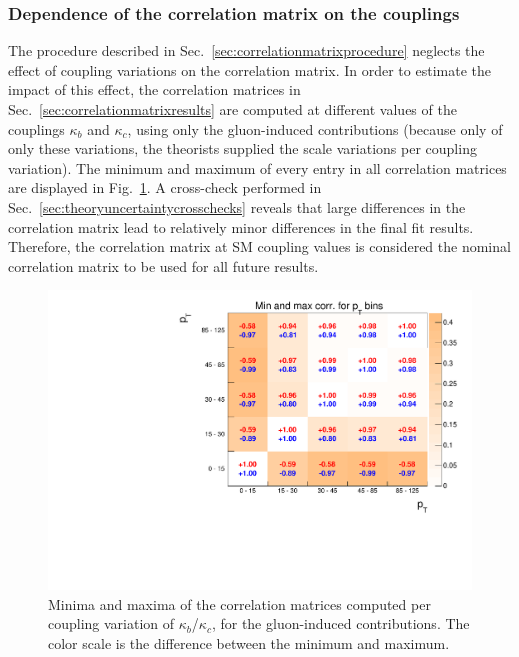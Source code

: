 \subsubsection{Dependence of the correlation matrix on the couplings}

The procedure described in Sec.~\ref{sec:correlationmatrixprocedure} neglects the effect of coupling variations on the correlation matrix.
% 
In order to estimate the impact of this effect, the correlation matrices in Sec.~\ref{sec:correlationmatrixresults} are computed at different values of the couplings $\kappa_b$ and $\kappa_c$, using only the gluon-induced contributions (because only of only these variations, the theorists supplied the scale variations per coupling variation).
% 
The minimum and maximum of every entry in all correlation matrices are displayed in Fig.~\ref{fig:CorrelationMatrix_minmaxStudy}.
% 
A cross-check performed in Sec.~\ref{sec:theoryuncertaintycrosschecks} reveals that large differences in the correlation matrix lead to relatively minor differences in the final fit results.
% 
Therefore, the correlation matrix at SM coupling values is considered the nominal correlation matrix to be used for all future results.

\begin{figure}[hbtp]
  \begin{center}
    \includegraphics[width=\halflinewidth]{img/interpretation/other/minmax_corrMat_exp.pdf}
    \caption{
        Minima and maxima of the correlation matrices computed per coupling variation of $\kappa_b$/$\kappa_c$, for the gluon-induced contributions.
        The color scale is the difference between the minimum and maximum.
        }
    \label{fig:CorrelationMatrix_minmaxStudy}
  \end{center}
\end{figure}


